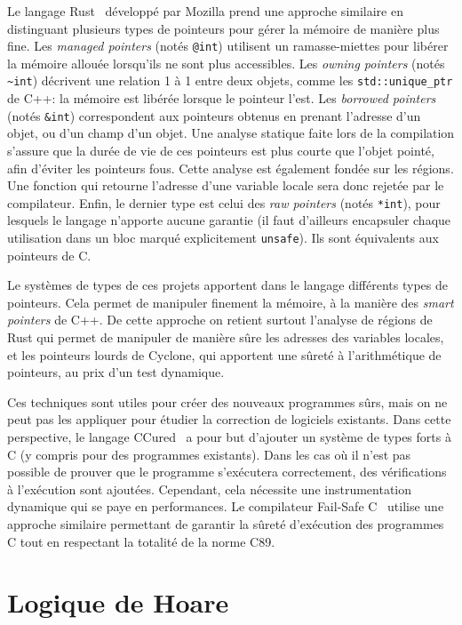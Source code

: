 Le langage Rust~ développé par Mozilla prend une approche similaire
en distinguant plusieurs types de pointeurs pour gérer la mémoire de manière
plus fine. Les \emph{managed pointers} (notés \texttt{@int}) utilisent un
ramasse-miettes pour libérer la mémoire allouée lorsqu'ils ne sont plus
accessibles. Les \emph{owning pointers} (notés \texttt{\textasciitilde{}int})
décrivent une relation 1 à 1 entre deux objets, comme les
\texttt{std::unique\_ptr} de C++: la mémoire est libérée lorsque le pointeur
l'est. Les \emph{borrowed pointers} (notés \texttt{\&int}) correspondent aux
pointeurs obtenus en prenant l'adresse d'un objet, ou d'un champ d'un objet. Une
analyse statique faite lors de la compilation s'assure que la durée de vie de
ces pointeurs est plus courte que l'objet pointé, afin d'éviter les pointeurs
fous. Cette analyse est également fondée sur les régions. Une fonction qui
retourne l'adresse d'une variable locale sera donc rejetée par le compilateur.
Enfin, le dernier type est celui des \emph{raw pointers} (notés \texttt{*int}),
pour lesquels le langage n'apporte aucune garantie (il faut d'ailleurs
encapsuler chaque utilisation dans un bloc marqué explicitement
\texttt{unsafe}). Ils sont équivalents aux pointeurs de C.

Le systèmes de types de ces projets apportent dans le langage différents types
de pointeurs. Cela permet de manipuler finement la mémoire, à la manière des
\emph{smart pointers} de C++. De cette approche on retient surtout l'analyse de
régions de Rust qui permet de manipuler de manière sûre les adresses des
variables locales, et les pointeurs lourds de Cyclone, qui apportent une sûreté
à l'arithmétique de pointeurs, au prix d'un test dynamique.

Ces techniques sont utiles pour créer des nouveaux programmes sûrs, mais on ne
peut pas les appliquer pour étudier la correction de logiciels existants. Dans
cette perspective, le langage CCured~\cite{ccured-toplas} a pour but d'ajouter
un système de types forts à C (y compris pour des programmes existants). Dans
les cas où il n'est pas possible de prouver que le programme s'exécutera
correctement, des vérifications à l'exécution sont ajoutées. Cependant, cela
nécessite une instrumentation dynamique qui se paye en performances. Le
compilateur Fail-Safe C~\cite{oiwa09} utilise une approche similaire permettant
de garantir la sûreté d'exécution des programmes C tout en respectant la
totalité de la norme C89.

\section{Logique de Hoare}

